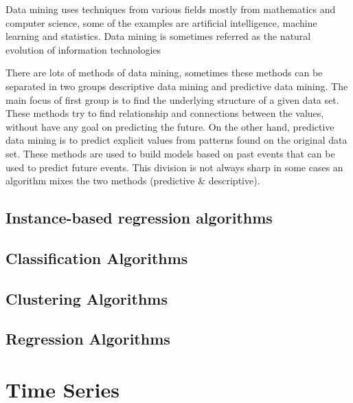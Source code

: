 Data mining uses techniques from various fields mostly from mathematics and computer science,
some of the examples are artificial intelligence, machine learning and statistics.
Data mining is sometimes referred as the natural evolution of information technologies \cite[p. 1]{HanKam06}

There are lots of methods of data mining, sometimes these methods can be separated in two groups
descriptive data mining and predictive data mining\cite{Fayyad96knowledgediscovery}.
The main focus of first group is to find the underlying structure of a given data set. These methods try to find relationship and connections
between the values, without have any goal on predicting the future. On the other hand,
predictive data mining is to predict explicit values from patterns found on the original data set. These methods are used to build models based on past
events that can be used to predict future events.
This division is not always sharp in some cases an algorithm mixes the two methods (predictive \& descriptive)\cite{Fayyad96knowledgediscovery}.

\subsection{Instance-based regression algorithms}\label{sec:instance}

\subsection{Classification Algorithms}\label{sec:classification}

\subsection{Clustering Algorithms}\label{sec:clust}

\subsection{Regression Algorithms}\label{sec:regr}

\section{Time Series}\label{sec:timeseries}
